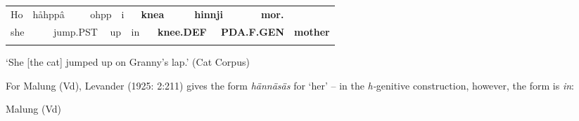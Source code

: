 \begin{tabular}{llllllllllllll}
\lsptoprule
Ho & \multicolumn{2}{l}{håhppâ

} & \multicolumn{2}{l}{ohpp

} & \multicolumn{2}{l}{i

} & \multicolumn{2}{l}{{\bfseries knea}

} & \multicolumn{2}{l}{{\bfseries hinnji}

} & \multicolumn{2}{l}{{\bfseries mor.}

} & \\
\multicolumn{2}{l}{she

} & \multicolumn{2}{l}{jump.PST

} & \multicolumn{2}{l}{up

} & \multicolumn{2}{l}{in

} & \multicolumn{2}{l}{{\bfseries knee.DEF}

} & \multicolumn{2}{l}{{\bfseries PDA.F.GEN}

} & \multicolumn{2}{l}{{\bfseries mother}

}\\
\lspbottomrule
\end{tabular}

\begin{styleTranslation}
‘She [the cat] jumped up on Granny’s lap.’ (Cat Corpus)

\end{styleTranslation}

For Malung (Vd), Levander (1925: 2:211) gives the form \textit{hännäsäs} for ‘her’ – in the \textit{h-}genitive construction, however, the form is \textit{in}: 


\begin{listWWNumileveli}
\item {}

\begin{styleExample}
Malung (Vd)

\end{styleExample}

\end{listWWNumileveli}

